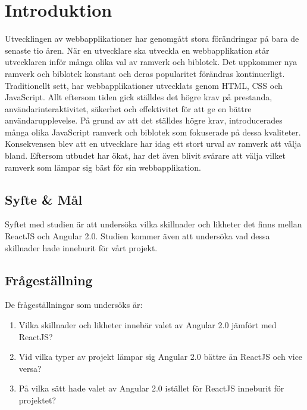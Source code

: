 \section{Introduktion}
\label{sec:axel-introduction}
Utvecklingen av webbapplikationer har genomgått stora förändringar på bara de senaste tio åren. När en utvecklare ska utveckla en webbapplikation står utvecklaren inför många olika val av ramverk och biblotek. Det uppkommer nya ramverk och biblotek konstant och deras popularitet förändras kontinuerligt. Traditionellt sett, har webbapplikationer utvecklats genom HTML, CSS och JavaScript. Allt eftersom tiden gick ställdes det högre krav på prestanda, användarinteraktivitet, säkerhet och effektivitet för att ge en bättre användarupplevelse. På grund av att det ställdes högre krav, introducerades många olika JavaScript ramverk och biblotek som fokuserade på dessa kvaliteter. Konsekvensen 
blev att en utvecklare har idag ett stort urval av ramverk att välja bland. Eftersom utbudet har ökat, har det även blivit svårare att välja vilket ramverk som lämpar sig bäst för sin webbapplikation.

\subsection{Syfte \& Mål}
\label{subsec:motivation}

Syftet med studien är att undersöka vilka skillnader och likheter det finns mellan ReactJS och Angular 2.0. Studien kommer även att undersöka vad dessa skillnader hade inneburit för vårt projekt. 

\subsection{Frågeställning}
\label{subsec:research-questions}

De frågeställningar som undersöks är:

\begin{enumerate}
\item Vilka skillnader och likheter innebär valet av Angular 2.0 jämfört med ReactJS?

\item Vid vilka typer av projekt lämpar sig Angular 2.0 bättre än ReactJS och vice versa?

\item På vilka sätt hade valet av Angular 2.0 istället för ReactJS inneburit för projektet?


\end{enumerate}


